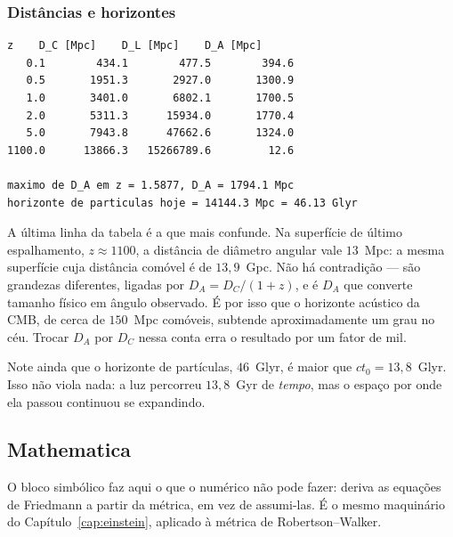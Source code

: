 \subsubsection*{Distâncias e horizontes}

\begin{saida}
\begin{lstlisting}[style=rgsaida]
     z    D_C [Mpc]    D_L [Mpc]    D_A [Mpc]
   0.1        434.1        477.5        394.6
   0.5       1951.3       2927.0       1300.9
   1.0       3401.0       6802.1       1700.5
   2.0       5311.3      15934.0       1770.4
   5.0       7943.8      47662.6       1324.0
1100.0      13866.3   15266789.6         12.6

maximo de D_A em z = 1.5877, D_A = 1794.1 Mpc
horizonte de particulas hoje = 14144.3 Mpc = 46.13 Glyr
\end{lstlisting}
\end{saida}

\begin{atencao}
A última linha da tabela é a que mais confunde. Na superfície de último
espalhamento, $z \approx 1100$, a distância de diâmetro angular vale
$13$~Mpc: a mesma superfície cuja distância comóvel é de $13{,}9$~Gpc. Não há
contradição --- são grandezas diferentes, ligadas por
$D_{A} = D_{C}/(1+z)$, e é $D_{A}$ que converte tamanho físico em ângulo
observado. É por isso que o horizonte acústico da CMB, de cerca de
$150$~Mpc comóveis, subtende aproximadamente um grau no céu. Trocar $D_{A}$
por $D_{C}$ nessa conta erra o resultado por um fator de mil.

Note ainda que o horizonte de partículas, $46$~Glyr, é maior que $c t_{0}
= 13{,}8$~Glyr. Isso não viola nada: a luz percorreu $13{,}8$~Gyr de
\emph{tempo}, mas o espaço por onde ela passou continuou se expandindo.
\end{atencao}

\subsection{Mathematica}


O bloco simbólico faz aqui o que o numérico não pode fazer: deriva as
equações de Friedmann a partir da métrica, em vez de assumi-las. É o mesmo
maquinário do Capítulo~\ref{cap:einstein}, aplicado à métrica de
Robertson--Walker.


